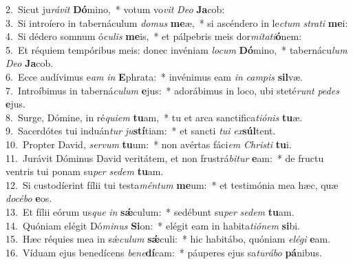 {2.~}Sicut ju\textit{rá}\textit{vit} \textbf{Dó}mino,~* votum vo\textit{vit} \textit{De}\textit{o} \textbf{Ja}cob:\\
{3.~}Si introíero in tabernáculum \textit{do}\textit{mus} \textbf{me}æ,~* si ascéndero in le\textit{ctum} \textit{stra}\textit{ti} \textbf{me}i:\\
{4.~}Si dédero somnum ó\textit{cu}\textit{lis} \textbf{me}is,~* et pálpebris meis dor\textit{mi}\textit{ta}\textit{ti}\textbf{ó}nem:\\
{5.~}Et réquiem tempóribus meis: donec invéniam \textit{lo}\textit{cum} \textbf{Dó}mino,~* tabernácu\textit{lum} \textit{De}\textit{o} \textbf{Ja}cob.\\
{6.~}Ecce audívimus e\textit{am} \textit{in} \textbf{E}phrata:~* invénimus eam \textit{in} \textit{cam}\textit{pis} \textbf{sil}væ.\\
{7.~}Introíbimus in taberná\textit{cu}\textit{lum} \textbf{e}jus:~* adorábimus in loco, ubi steté\textit{runt} \textit{pe}\textit{des} \textbf{e}jus.\\
{8.~}Surge, Dómine, in ré\textit{qui}\textit{em} \textbf{tu}am,~* tu et arca sanctifica\textit{ti}\textit{ó}\textit{nis} \textbf{tu}æ.\\
{9.~}Sacerdótes tui induán\textit{tur} \textit{ju}\textbf{stí}tiam:~* et sancti \textit{tu}\textit{i} \textit{ex}\textbf{súl}tent.\\
{10.~}Propter David, \textit{ser}\textit{vum} \textbf{tu}um:~* non avértas fáci\textit{em} \textit{Chri}\textit{sti} \textbf{tu}i.\\
{11.~}Jurávit Dóminus David veritátem, et non frustrá\textit{bi}\textit{tur} \textbf{e}am:~* de fructu ventris tui ponam su\textit{per} \textit{se}\textit{dem} \textbf{tu}am.\\
{12.~}Si custodíerint fílii tui testa\textit{mén}\textit{tum} \textbf{me}um:~* et testimónia mea hæc, quæ \textit{do}\textit{cé}\textit{bo} \textbf{e}os.\\
{13.~}Et fílii eórum us\textit{que} \textit{in} \textbf{sǽ}culum:~* sedébunt su\textit{per} \textit{se}\textit{dem} \textbf{tu}am.\\
{14.~}Quóniam elégit Dó\textit{mi}\textit{nus} \textbf{Si}on:~* elégit eam in habita\textit{ti}\textit{ó}\textit{nem} \textbf{si}bi.\\
{15.~}Hæc réquies mea in sǽ\textit{cu}\textit{lum} \textbf{sǽ}culi:~* hic habitábo, quóniam \textit{e}\textit{lé}\textit{gi} \textbf{e}am.\\
{16.~}Víduam ejus benedícens \textit{be}\textit{ne}\textbf{dí}cam:~* páuperes ejus sa\textit{tu}\textit{rá}\textit{bo} \textbf{pá}nibus.\\
